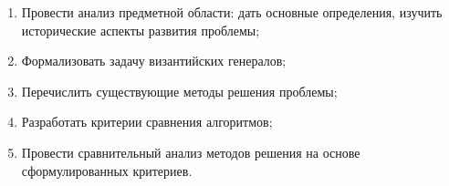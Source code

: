 \begin{enumerate}

\item Провести анализ предметной области: дать основные определения, изучить исторические аспекты развития проблемы;

\item Формализовать задачу византийских генералов;

\item Перечислить существующие методы решения проблемы;

\item Разработать критерии сравнения алгоритмов;

\item Провести сравнительный анализ методов решения на основе сформулированных критериев.

\end{enumerate}

\newpage